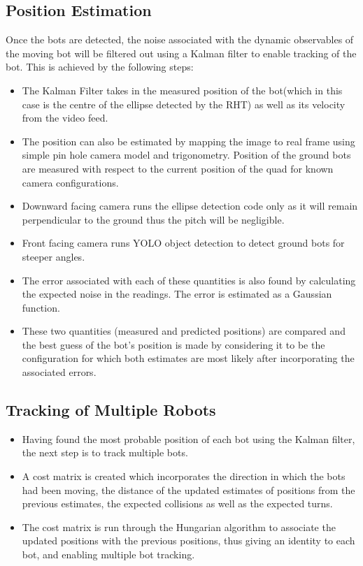 \documentclass[12pt]{article}
\begin{document}
    \subsection{Position Estimation}
        Once the bots are detected, the noise associated with the dynamic observables of the moving bot will be filtered out using a Kalman filter to enable tracking of the bot.  This is achieved by the following steps:
        \begin{itemize}
            \item The Kalman Filter takes in the measured position of the bot(which in this case is the centre of the ellipse detected by the RHT) as well as its velocity from the video feed.
            \item The position can also be estimated by mapping the image to real frame using simple pin hole camera model and trigonometry. Position of the ground bots are measured with respect to the current position of the quad for known camera configurations.
            \item Downward facing camera runs the ellipse detection code only as it will remain perpendicular to the ground thus the pitch will be negligible.
            \item Front facing camera runs YOLO object detection to detect ground bots for steeper angles.
            
            \item The error associated with each of these quantities is also found by calculating the expected noise in the readings. The error is estimated as a Gaussian function. 
            \item These two quantities (measured and predicted positions) are compared and the best guess of the bot’s position is made by considering it to be the configuration for which both estimates are most likely after incorporating the associated errors.
        \end{itemize}
    
    \subsection{Tracking of Multiple Robots}
        \begin{itemize}
            \item Having found the most probable position of each bot using the Kalman filter, the next step is to track multiple bots.
            \item A cost matrix is created which incorporates the direction in which the bots had been moving, the distance of the updated estimates of positions from the previous estimates, the expected collisions as well as the expected turns.
            \item The cost matrix is run through the Hungarian algorithm to associate the updated positions with the previous positions, thus giving an identity to each bot, and enabling multiple bot tracking.
        \end{itemize}
\end{document}
